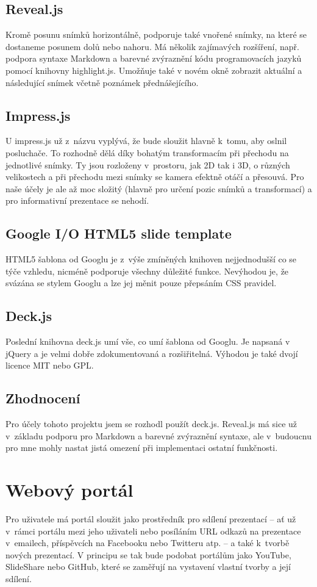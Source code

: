 \documentclass[11pt,twoside,a4paper]{book}
\begin{document}
\subsection{Reveal.js}
Kromě posunu snímků horizontálně, podporuje také vnořené snímky, na které se dostaneme posunem dolů nebo nahoru. Má několik zajímavých rozšíření, např. podpora syntaxe Markdown a barevné zvýraznění kódu programovacích jazyků pomocí knihovny highlight.js. Umožňuje také v novém okně zobrazit aktuální a následující snímek včetně poznámek přednášejícího.

\subsection{Impress.js}
U impress.js už z~názvu vyplývá, že bude sloužit hlavně k~tomu, aby oslnil posluchače. To rozhodně dělá díky bohatým transformacím při přechodu na jednotlivé snímky. Ty jsou rozloženy v~prostoru, jak 2D tak i 3D, o různých velikostech a při přechodu mezi snímky se kamera efektně otáčí a přesouvá. Pro naše účely je ale až moc složitý (hlavně pro určení pozic snímků a transformací) a pro informativní prezentace se nehodí.

\subsection{Google I/O HTML5 slide template}
HTML5 šablona od Googlu je z~výše zmíněných knihoven nejjednodušší co se týče vzhledu, nicméně podporuje všechny
důležité funkce. Nevýhodou je, že svázána se stylem Googlu a lze jej měnit pouze přepsáním CSS pravidel.

\subsection{Deck.js}
Poslední knihovna deck.js umí vše, co umí šablona od Googlu. Je napsaná v jQuery a je velmi dobře zdokumentovaná a rozšiřitelná. Výhodou je také dvojí licence MIT nebo GPL.

\subsection{Zhodnocení}
Pro účely tohoto projektu jsem se rozhodl použít deck.js. Reveal.js má sice už v~základu podporu pro Markdown a barevné
zvýraznění syntaxe, ale v~budoucnu pro mne mohly nastat jistá omezení při implementaci ostatní funkčnosti.


\section{Webový portál}
Pro uživatele má portál sloužit jako prostředník pro sdílení prezentací – ať už v~rámci portálu mezi jeho uživateli nebo
posíláním URL odkazů na prezentace v~emailech, příspěvcích na Facebooku nebo Twitteru atp. – a také k~tvorbě nových
prezentací. V principu se tak bude podobat portálům jako YouTube, SlideShare nebo GitHub, které se zaměřují na vystavení vlastní tvorby a její sdílení.
\end{document}
